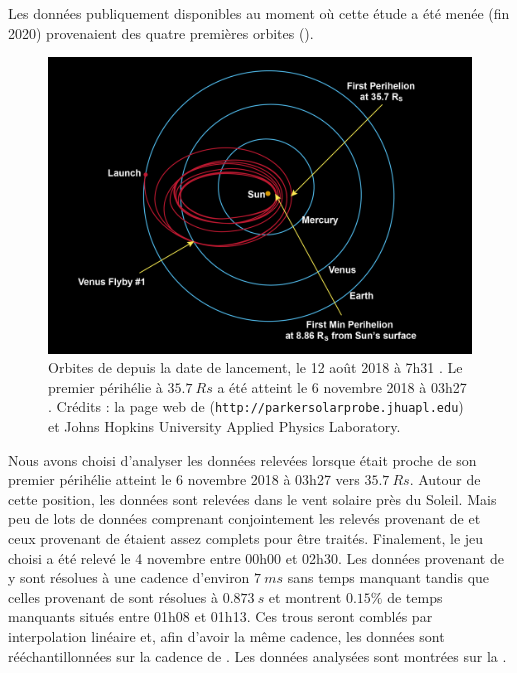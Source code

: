 Les données publiquement disponibles au moment où cette étude a été menée (fin 2020) provenaient des quatre premières orbites (). 
\begin{figure}[!ht]
 \centering
\includegraphics[width=0.9\linewidth,trim=0cm 0cm 0cm 0cm, clip=false]{./Mainmatter/Part_1/images/16-00815_MissionDesign}
\cprotect\caption{Orbites de  depuis la date de lancement, le 12 août 2018 à 7h31 . Le premier périhélie à $\SI{35.7}{Rs}$ a été atteint le 6 novembre 2018 à 03h27 . Crédits : la page web de  (\verb|http://parkersolarprobe.jhuapl.edu|) et Johns Hopkins University Applied Physics Laboratory.}
\label{fig:orbit_PSP}
\end{figure}
Nous avons choisi d'analyser les données relevées lorsque  était proche de son premier périhélie atteint le 6 novembre 2018 à 03h27  vers $\SI{35.7}{Rs}$. Autour de cette position, les données sont relevées dans le vent solaire près du Soleil. Mais peu de lots de données comprenant conjointement les relevés provenant de  et ceux provenant de  étaient assez complets pour être traités. Finalement, le jeu choisi a été relevé le 4 novembre entre 00h00 et 02h30. Les données provenant de  y sont résolues à une cadence d'environ $\SI{7}{ms}$ sans temps manquant tandis que celles provenant de  sont résolues à $\SI{0,873}{s}$ et montrent $0.15\%$ de temps manquants situés entre 01h08 et 01h13. Ces trous seront comblés par interpolation linéaire et, afin d'avoir la même cadence, les données  sont rééchantillonnées sur la cadence de . Les données analysées sont montrées sur la .  
